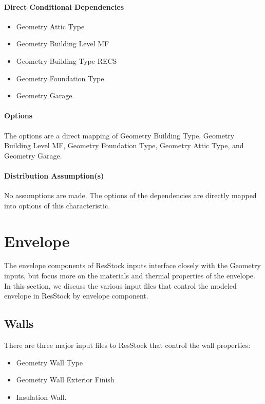 \paragraph{Direct Conditional Dependencies}
\begin{itemize}
    \item Geometry Attic Type
    \item Geometry Building Level MF
    \item Geometry Building Type RECS
    \item Geometry Foundation Type
    \item Geometry Garage.
\end{itemize}

\paragraph{Options}
The options are a direct mapping of Geometry Building Type, Geometry Building Level MF, Geometry Foundation Type, Geometry Attic Type, and Geometry Garage. 

\paragraph{Distribution Assumption(s)}
No assumptions are made. The options of the dependencies are directly mapped into options of this characteristic.



\section{Envelope}

The envelope components of ResStock inputs interface closely with the Geometry inputs, but focus more on the materials and thermal properties of the envelope. In this section, we discuss the various input files that control the modeled envelope in ResStock by envelope component. 


\subsection{Walls}

There are three major input files to ResStock that control the wall properties:
\begin{itemize}
    \item Geometry Wall Type
    \item Geometry Wall Exterior Finish
    \item Insulation Wall.
\end{itemize}


